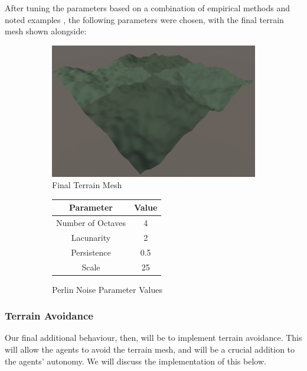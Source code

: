 \documentclass[12pt]{article}
\begin{document}
After tuning the parameters based on a combination of empirical methods and noted examples \cite[pg.3-4]{Etherington}, the following parameters were chosen, with the final terrain mesh shown alongside:

\begin{figure}[ht]
    \centering
    \begin{subfigure}{0.4\textwidth}
        \centering
        \includegraphics[width=\linewidth]{lacunarity2.png}
        \caption{Final Terrain Mesh}
        \label{fig:final}
    \end{subfigure}
    \hfill
    \begin{subfigure}{0.4\textwidth}
        \centering
        \begin{tabular}{|c|c|}
            \hline
            Parameter & Value \\
            \hline
            Number of Octaves & 4 \\
            \hline
            Lacunarity & 2 \\
            \hline
            Persistence & 0.5 \\
            \hline
            Scale & 25 \\
            \hline
        \end{tabular}
        \caption{Perlin Noise Parameter Values}
        \label{tab:parameter-values}
    \end{subfigure}
    \caption{}
    \label{fig:parameter-values-lacunarity2}
\end{figure}

\subsubsection{Terrain Avoidance}
\label{sec:terrain-avoidance}
Our final additional behaviour, then, will be to implement terrain avoidance. This will allow the agents to avoid the terrain mesh, and will be a crucial addition to the agents' autonomy. We will discuss the implementation of this below.
\end{document}
